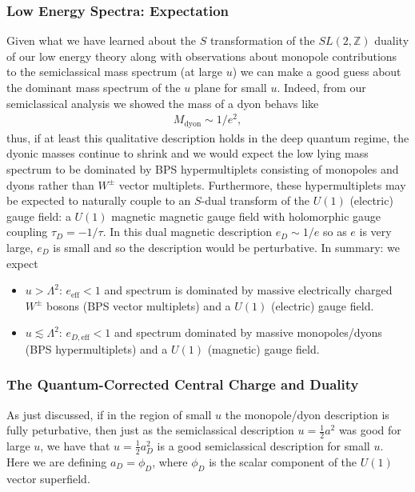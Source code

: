 \documentclass[12pt, onecolumn]{article}
\begin{document}
\subsubsection{Low Energy Spectra: Expectation}
Given what we have learned about the $S$ transformation of the $SL(2,\mathbb{Z})$ duality of our low energy theory along with observations about monopole contributions to the semiclassical mass spectrum (at large $u$) we can make a good guess about the dominant mass spectrum of the $u$ plane for small $u$.  Indeed, from our semiclassical analysis we showed the mass of a dyon behavs like 
\begin{align*}
M_{\text{dyon}} \sim 1/e^2,
\end{align*}
thus, if at least this qualitative description holds in the deep quantum regime, the dyonic masses continue to shrink and we would expect the low lying mass spectrum to be dominated by BPS hypermultiplets consisting of monopoles and dyons rather than $W^{\pm}$ vector multiplets.  Furthermore, these hypermultiplets may be expected to naturally couple to an $S$-dual transform of the $U(1)$ (electric) gauge field: a $U(1)$ magnetic magnetic gauge field with holomorphic gauge coupling $\tau_{D} = -1/\tau$.  In this dual magnetic description $e_{D} \sim 1/e$ so as $e$ is very large, $e_{D}$ is small and so the description would be perturbative.  In summary: we expect
\begin{itemize}
\item $u > \Lambda^2$: $e_{\text{eff}}<1$ and spectrum is dominated by massive electrically charged $W^{\pm}$ bosons (BPS vector multiplets) and a $U(1)$ (electric) gauge field.
\item $u \lesssim \Lambda^2$: $e_{D,\text{eff}}<1$ and spectrum dominated by massive monopoles/dyons (BPS hypermultiplets) and a $U(1)$ (magnetic) gauge field.
\end{itemize}

\subsubsection{The Quantum-Corrected Central Charge and Duality}
As just discussed, if in the region of small $u$ the monopole/dyon description is fully peturbative, then just as the semiclassical description $u = \frac{1}{2}a^2$ was good for large $u$, we have that $u= \frac{1}{2}a_{D}^2$ is a good semiclassical description for small $u$.  Here we are defining $a_{D}=\phi_{D}$, where $\phi_{D}$ is the scalar component of the $U(1)$ vector superfield.  
\end{document}
